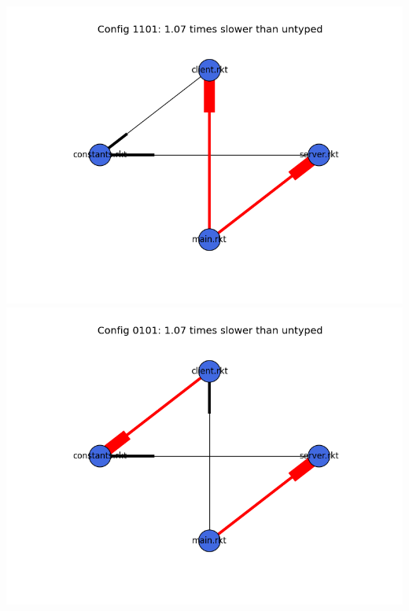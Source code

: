\documentclass{article}
\begin{document}
\begin{itemize}
\includegraphics[width=\textwidth]{echo-module-graph-1101.png}
\includegraphics[width=\textwidth]{echo-module-graph-0101.png}
\end{itemize}
\end{document}
